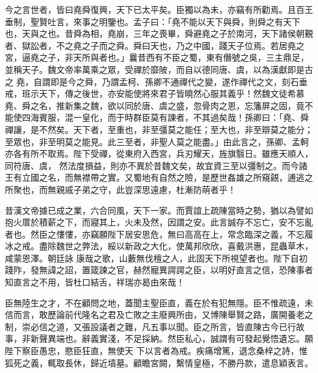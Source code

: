 \begin{pinyinscope}
 今之言世者，皆曰堯舜復興，天下已太平矣。臣獨以為未，亦竊有所勸焉。且百王垂制，聖賢吐言，來事之明鑒也。孟子曰：「堯不能以天下與舜，則舜之有天下也，天與之也。昔舜為相，堯崩，三年之喪畢，舜避堯之子於南河，天下諸侯朝覲者、獄訟者，不之堯之子而之舜。舜曰天也，乃之中國，踐天子位焉。若居堯之宮，逼堯之子，非天所與者也。」曩昔西有不臣之蜀，東有僭號之吳，三主鼎足，並稱天子。魏文帝率萬乘之眾，受禪於靡陂，而自以德同唐、虞，以為漢獻即是古之
 堯，自謂即是今之舜，乃謂孟柯、孫卿不通禪代之變，遂作禪代之文，刻石垂戒，班示天下，傳之後世，亦安能使將來君子皆曉然心服其義乎！然魏文徒希慕堯、舜之名，推新集之魏，欲以同於唐、虞之盛，忽骨肉之恩，忘籓屏之固，竟不能使四海賓服，混一皇化，而于時群臣莫有諫者，不其過矣哉！孫卿曰：「堯、舜禪讓，是不然矣。天下者，至重也，非至彊莫之能任；至大也，非至辯莫之能分；至眾也，非至明莫之能見。此三至者，非聖人莫之能盡。」由此言之，孫卿、孟軻亦各有所不取焉。陛下受禪，從東府入西宮，兵刃耀天，旌旗翳日。雖應天順人，同符唐、虞，
 然法度損益，則亦不異於昔魏文矣，故宜資三至以彊制之。而今諸王有立國之名，而無襟帶之實。又蜀地有自然之險，是歷世姦雄之所窺覦，逋逃之所聚也，而無親戚子弟之守，此豈深思遠慮，杜漸防萌者乎！



 昔漢文帝據已成之業，六合同風，天下一家。而賈誼上疏陳當時之勢，猶以為譬如抱火厝於積薪之下，而寢其上，火未及然，因謂之安。此言誠存不忘亡，安不忘亂者也。然臣之慺慺，亦竊願陛下居安思危，無曰高高在上，常念臨深之義，不忘履冰之戒。盡除魏世之弊法，綏以新政之大化，使萬邦欣欣，喜戴洪惠，昆蟲草木，咸蒙恩澤。朝廷詠
 康哉之歌，山藪無伐檀之人，此固天下所視望者也。陛下自初踐阼，發無諱之詔，置箴諫之官，赫然寵異諤諤之臣，以明好直言之信，恐陳事者知直言之不用，皆杜口結舌，祥瑞亦曷由來哉！



 臣無陸生之才，不在顧問之地，蓋聞主聖臣直，義在於有犯無隱。臣不惟疏遠，未信而言，敢歷論前代隆名之君及亡敗之主廢興所由，又博陳舉賢之路，廣開養老之制，崇必信之道，又張設議者之難，凡五事以聞。臣之所言，皆直陳古今已行故事，非新聲異端也。辭義實淺，不足採納。然臣私心，誠謂有可發起覺悟遺忘。願陛下察臣愚忠，愍臣狂直，無使天
 下以言者為戒。疾痛增篤，退念桑梓之詩，惟狐死之義，輒取長休，歸近墳墓。顧瞻宮闕，繫情皇極，不勝丹款，遣息穎表言。




\end{pinyinscope}

